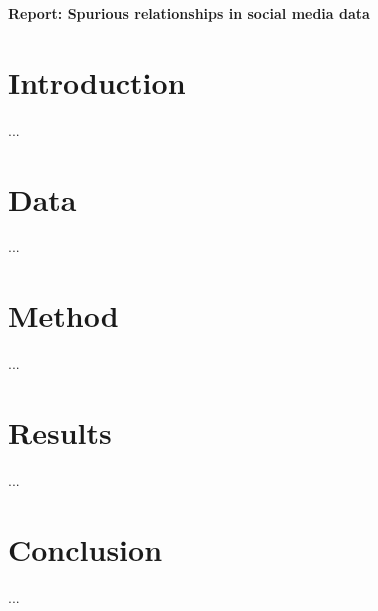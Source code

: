 \documentclass[12pt, a4paper]{article}
\begin{document}
\textbf{Report: Spurious relationships in social media data}

\begin{abstract}
...
\end{abstract}


\vspace{0.2in}

\section{Introduction}
...

\section{Data}
...

\section{Method}
...

\section{Results}
...

\section{Conclusion}
...
\end{document}
